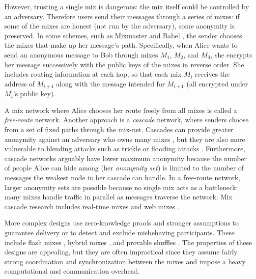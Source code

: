 \documentclass[final]{ieee}
\begin{document}
However, trusting a single mix is dangerous: the mix itself could be
controlled by an adversary. Therefore users send their messages through
a series of mixes: if some of the mixes are honest (not run by the
adversary),
some anonymity is preserved. In some schemes, such as Mixmaster
\cite{mixmaster-spec} and Babel \cite{babel}, the sender chooses the
mixes that make up her message's path. Specifically, when Alice
wants to send an anonymous message to Bob through mixes $M_1$, $M_2$,
and $M_3$, she encrypts her message successively with the public keys of
the mixes in reverse order. She includes routing information at each hop,
so that each mix $M_i$ receives the address of $M_{i+1}$ along with the
message intended for $M_{i+1}$ (all encrypted under $M_i$'s public key).

A mix network where Alice chooses her route freely from all mixes is
called a \emph{free-route} network. Another approach is a \emph{cascade}
network, where senders choose from a set of fixed paths through the
mix-net. Cascades can provide greater anonymity against an adversary
who owns many mixes \cite{disad-free-routes}, but they are also more
vulnerable to blending attacks such as trickle or flooding attacks
\cite{trickle02}.
Furthermore, cascade networks arguably have lower maximum anonymity because
the number of people Alice can hide among (her \emph{anonymity set}) is limited
to the number of messages the weakest node in her cascade can handle.
In a free-route network, larger anonymity sets are possible because no
single mix acts as a bottleneck: many mixes handle traffic in parallel as
messages traverse the network.
Mix cascade research includes real-time
mixes \cite{realtime-mix} and web mixes \cite{web-mix}.

More complex designs use zero-knowledge proofs and stronger assumptions
to guarantee delivery or to detect and exclude misbehaving participants.
These include flash mixes \cite{flash-mix},
hybrid mixes \cite{jakobsson-optimally}\cite{hybrid-mix},
and provable shuffles \cite{PShuffle}\cite{shuffle}. The properties
of these designs are appealing, but they are often impractical since
they assume fairly strong coordination and synchronization between the mixes
and impose a heavy computational and communication overhead.
\end{document}
